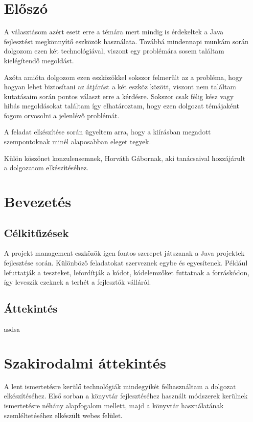 \documentclass{article}
\begin{document}
	\newpage
	
	\section{Előszó}\label{sec:prolog}
	A választásom azért esett erre a témára mert mindig is érdekeltek a Java fejlesztést megkönnyítő eszközök használata. Továbbá mindennapi munkám során dolgozom ezen két technológiával, viszont egy problémára sosem találtam kielégítendő megoldást.
	
	Azóta amióta dolgozom ezen eszközökkel sokszor felmerült az a probléma, hogy hogyan lehet biztosítani az átjárást a két eszköz között, viszont nem találtam kutatásaim során pontos választ erre a kérdésre. Sokszor csak félig kész vagy hibás megoldásokat találtam így elhatároztam, hogy ezen dolgozat témájaként fogom orvosolni a jelenlévő problémát.
	
	A feladat elkészítése során ügyeltem arra, hogy a kiírásban megadott szempontoknak minél alaposabban eleget tegyek.
	
	Külön köszönet konzulensemnek, Horváth Gábornak, aki tanácsaival hozzájárult a dolgozatom elkészítéséhez.
	
	\newpage
	\section{Bevezetés}\label{sec:introduction}
	\subsection{Célkitűzések}\label{subsec:goals}
	A projekt management eszközök igen fontos szerepet játszanak a Java projektek fejlesztése során. Különböző feladatokat szerveznek egybe és egyesítenek. Például lefuttatják a teszteket, lefordítják a kódot, kódelemzőket futtatnak a forráskódon, így leveszik ezeknek a terhét a fejlesztők válláról. 
	\subsection{Áttekintés}\label{subsec:review}
	asdsa
	\newpage
\section{Szakirodalmi áttekintés}\label{sec:prof_review}
A lent ismertetésre kerülő technológiák mindegyikét felhasználtam a dolgozat elkészítéséhez. Első sorban a könyvtár fejlesztéséhez használt módszerek kerülnek ismertetésre néhány alapfogalom mellett, majd a könyvtár használatának szemléltetéséhez elkészült webes felület.
\end{document}
